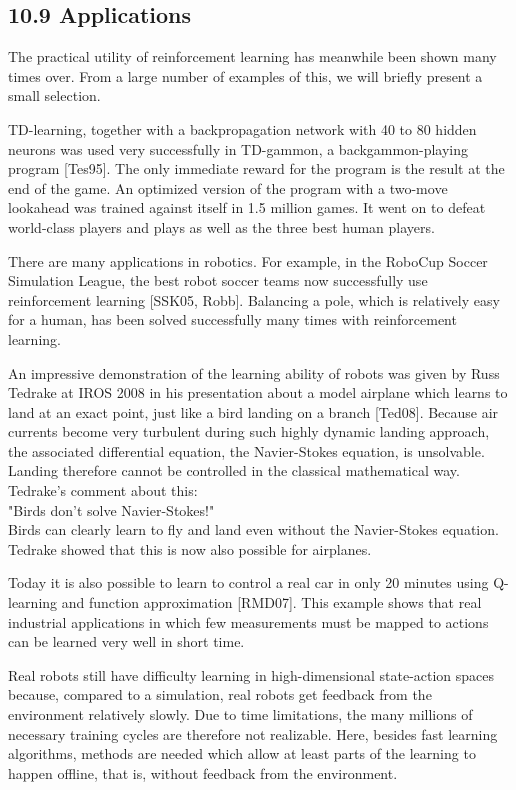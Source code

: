 \documentclass[10pt]{book}
\begin{document}
\begin{center}
\begin{enumerate}
\begin{center}
\begin{center}
\begin{center}
\begin{center}
\begin{center}
\subsection*{10.9 Applications}
The practical utility of reinforcement learning has meanwhile been shown many times over. From a large number of examples of this, we will briefly present a small selection.

TD-learning, together with a backpropagation network with 40 to 80 hidden neurons was used very successfully in TD-gammon, a backgammon-playing program [Tes95]. The only immediate reward for the program is the result at the end of the game. An optimized version of the program with a two-move lookahead was trained against itself in 1.5 million games. It went on to defeat world-class players and plays as well as the three best human players.

There are many applications in robotics. For example, in the RoboCup Soccer Simulation League, the best robot soccer teams now successfully use reinforcement learning [SSK05, Robb]. Balancing a pole, which is relatively easy for a human, has been solved successfully many times with reinforcement learning.

An impressive demonstration of the learning ability of robots was given by Russ Tedrake at IROS 2008 in his presentation about a model airplane which learns to land at an exact point, just like a bird landing on a branch [Ted08]. Because air currents become very turbulent during such highly dynamic landing approach, the associated differential equation, the Navier-Stokes equation, is unsolvable. Landing therefore cannot be controlled in the classical mathematical way. Tedrake's comment about this:\\
"Birds don't solve Navier-Stokes!"\\
Birds can clearly learn to fly and land even without the Navier-Stokes equation. Tedrake showed that this is now also possible for airplanes.

Today it is also possible to learn to control a real car in only 20 minutes using Q-learning and function approximation [RMD07]. This example shows that real industrial applications in which few measurements must be mapped to actions can be learned very well in short time.

Real robots still have difficulty learning in high-dimensional state-action spaces because, compared to a simulation, real robots get feedback from the environment relatively slowly. Due to time limitations, the many millions of necessary training cycles are therefore not realizable. Here, besides fast learning algorithms, methods are needed which allow at least parts of the learning to happen offline, that is, without feedback from the environment.


\end{center}
\end{center}
\end{center}
\end{center}
\end{center}
\end{enumerate}
\end{center}
\end{document}
